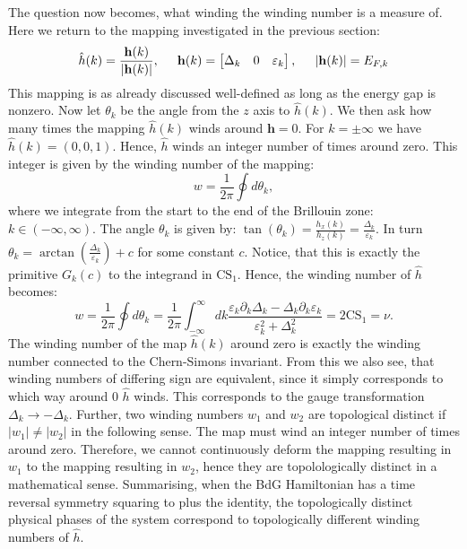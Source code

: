 The question now becomes, what winding the winding number is a measure of. Here we return to the mapping investigated in the previous section: 
\begin{equation}
\hat{h}(k) = \frac{\mathbf{h}(k)}{|\mathbf{h}(k)|}, \hspace{0.5cm} \mathbf{h}(k) = \begin{bmatrix} \Delta_k & 0 & \varepsilon_k \end{bmatrix}, \hspace{0.5cm}  |\mathbf{h}(k)| = E_{F,k} \nonumber
\end{equation}
This mapping is as already discussed well-defined as long as the energy gap is nonzero. Now let $\theta_k$ be the angle from the $z$ axis to $\hat{h}(k)$. We then ask how many times the mapping $\hat{h}(k)$ winds around $\mathbf{h} = 0$. For $k = \pm \infty$ we have $\hat{h}(k) = (0, 0, 1)$. Hence, $\hat{h}$ winds an integer number of times around zero. This integer is given by the winding number of the mapping:
\begin{equation}
w = \frac{1}{2\pi}\oint d\theta_k, \nonumber
\end{equation}  
where we integrate from the start to the end of the Brillouin zone: $k \in (-\infty, \infty)$. The angle $\theta_k$ is given by: $\tan(\theta_k) = \frac{h_x(k)}{h_z(k)} = \frac{\Delta_k}{\varepsilon_k}$. In turn $\theta_k = \arctan\left(\frac{\Delta_k}{\varepsilon_k}\right) + c$ for some constant $c$. Notice, that this is exactly the primitive $G_k(c)$ to the integrand in $\text{CS}_1$. Hence, the winding number of $\hat{h}$ becomes:
\begin{equation}
w = \frac{1}{2\pi}\oint d\theta_k = \frac{1}{2\pi}\int_{-\infty}^{\infty} dk \frac{\varepsilon_k\partial_k\Delta_k - \Delta_k\partial_k\varepsilon_k}{\varepsilon^2_k + \Delta^2_k} = 2\text{CS}_1 = \nu. \nonumber
\end{equation}
The winding number of the map $\hat{h}(k)$ around zero is exactly the winding number connected to the Chern-Simons invariant. From this we also see, that winding numbers of differing sign are equivalent, since it simply corresponds to which way around $0$ $\hat{h}$ winds. This corresponds to the gauge transformation $\Delta_k \to - \Delta_k$. Further, two winding numbers $w_1$ and $w_2$ are topological distinct if $|w_1|\neq |w_2|$ in the following sense. The map must wind an integer number of times around zero. Therefore, we cannot continuously deform the mapping resulting in $w_1$ to the mapping resulting in $w_2$, hence they are topolologically distinct in a mathematical sense. Summarising, when the BdG Hamiltonian has a time reversal symmetry squaring to plus the identity, the topologically distinct physical phases of the system correspond to topologically different winding numbers of $\hat{h}$.  

